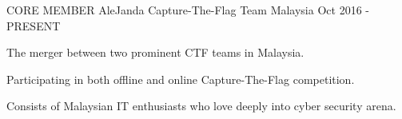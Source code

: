 

\begin{cventries}

    \cventry
    {CORE MEMBER}
    {AleJanda Capture-The-Flag Team}
    {Malaysia}
    {Oct 2016 - PRESENT}
    {
      \begin{cvitems}
        \item {The merger between two prominent CTF teams in Malaysia.}
        \item {Participating in both offline and online Capture-The-Flag competition.}
        \item {Consists of Malaysian IT enthusiasts who love deeply into cyber security arena.}
      \end{cvitems}
    }
\end{cventries}
